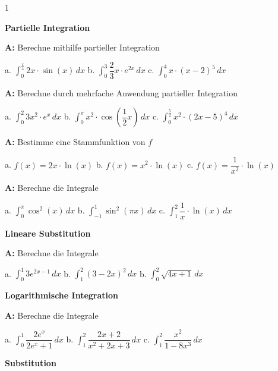 \documentclass[landscape,twocolumn,a4paper]{article}
\begin{document}
\newcommand{\ggT}{\operatorname{ggT}}
\newcommand{\Mod}[3]{#1\equiv#2\text{ mod }#3}
\newcommand{\tmod}{\text{ mod }}
\newcommand\x{1}
\setcounter {y} {1}

\parindent 0mm

\textbf{Partielle Integration} 
\bigskip

\textbf{A:}   
Berechne mithilfe partieller Integration

a.  $\displaystyle\int_0^{\frac{\pi}{4}} 2x \cdot \sin(x) \, dx$ \quad
b.  $\displaystyle\int_0^3 \dfrac{2}{3}x \cdot e^{2x} \, dx$ \quad
c.  $\displaystyle\int_0^4 x \cdot (x-2)^5 \, dx$ \quad
\bigskip  {}

\textbf{A:}   
Berechne durch mehrfache Anwendung partieller Integration

a.  $\displaystyle\int_0^2 3x^2 \cdot e^x \, dx$ \quad
b.  $\displaystyle\int_0^{\pi} x^2 \cdot \cos(\dfrac{1}{2}x)\, dx$ \quad
c.  $\displaystyle\int_0^{\frac{5}{2}} x^2\cdot (2x-5)^4 \, dx$ \quad
\bigskip  {}

\textbf{A:}   
Bestimme eine Stammfunktion von $f$

a.  $f(x) = 2x \cdot \ln(x)$ \quad
b.  $f(x) = x^2 \cdot \ln(x)$ \quad
c.  $f(x) = \dfrac{1}{x^2} \cdot \ln(x)$ \quad
\bigskip  {}

\textbf{A:}   
Berechne die Integrale

a.  $\displaystyle\int_0^{\pi} \cos^2(x)\, dx$ \quad
b.  $\displaystyle\int_{-1}^1 \sin^2(\pi x)\, dx$ \quad
c.  $\displaystyle\int_1^2 \dfrac{1}{x} \cdot \ln(x)\, dx$ \quad
\bigskip  {}


\textbf{Lineare Substitution} 
\bigskip

\textbf{A:}  
Berechne die Integrale

a.  $\displaystyle\int_0^1 3e^{2x-1}\, dx$ \quad
b.  $\displaystyle\int_1^2 (3-2x)^2\, dx$ \quad
b.  $\displaystyle\int_0^2 \sqrt{4x+1}\, dx$ \quad
\bigskip  {}

\textbf{Logarithmische Integration} 
\bigskip

\textbf{A:}   
Berechne die Integrale 

a.  $\displaystyle\int_0^1 \dfrac{2e^x}{2e^x+1}  \, dx$ \quad
b.  $\displaystyle\int_1^2 \dfrac{2x+2}{x^2+2x+3} \, dx$ \quad
c.  $\displaystyle\int_1^2 \dfrac{x^2}{1-8x^3}  \, dx$ \quad
\bigskip  {}

\textbf{Substitution} 
\bigskip
\end{document}
